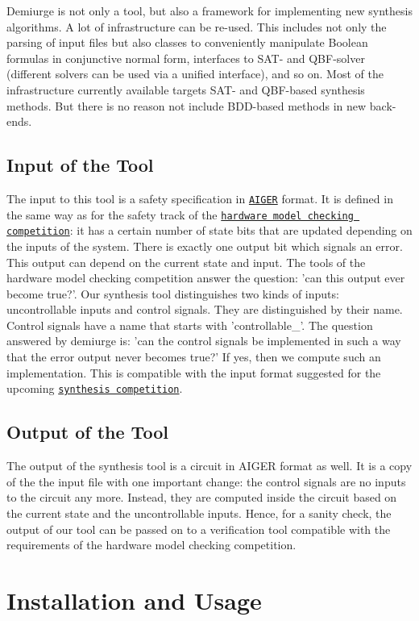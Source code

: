 Demiurge is not only a tool, but also a framework for implementing new synthesis algorithms. A lot of infrastructure can be re-\/used. This includes not only the parsing of input files but also classes to conveniently manipulate Boolean formulas in conjunctive normal form, interfaces to S\-A\-T-\/ and Q\-B\-F-\/solver (different solvers can be used via a unified interface), and so on. Most of the infrastructure currently available targets S\-A\-T-\/ and Q\-B\-F-\/based synthesis methods. But there is no reason not include B\-D\-D-\/based methods in new back-\/ends.\hypertarget{index_input_sec}{}\subsection{Input of the Tool}\label{index_input_sec}
The input to this tool is a safety specification in \href{http://fmv.jku.at/aiger/}{\tt A\-I\-G\-E\-R} format. It is defined in the same way as for the safety track of the \href{http://fmv.jku.at/hwmcc13/}{\tt hardware model checking competition}\-: it has a certain number of state bits that are updated depending on the inputs of the system. There is exactly one output bit which signals an error. This output can depend on the current state and input. The tools of the hardware model checking competition answer the question\-: 'can this output ever become true?'. Our synthesis tool distinguishes two kinds of inputs\-: uncontrollable inputs and control signals. They are distinguished by their name. Control signals have a name that starts with 'controllable\-\_\-'. The question answered by demiurge is\-: 'can the control signals be implemented in such a way that the error output never becomes true?' If yes, then we compute such an implementation. This is compatible with the input format suggested for the upcoming \href{http://www.syntcomp.org/}{\tt synthesis competition}.\hypertarget{index_output_sec}{}\subsection{Output of the Tool}\label{index_output_sec}
The output of the synthesis tool is a circuit in A\-I\-G\-E\-R format as well. It is a copy of the the input file with one important change\-: the control signals are no inputs to the circuit any more. Instead, they are computed inside the circuit based on the current state and the uncontrollable inputs. Hence, for a sanity check, the output of our tool can be passed on to a verification tool compatible with the requirements of the hardware model checking competition.\hypertarget{index_install_sec}{}\section{Installation and Usage}\label{index_install_sec}
